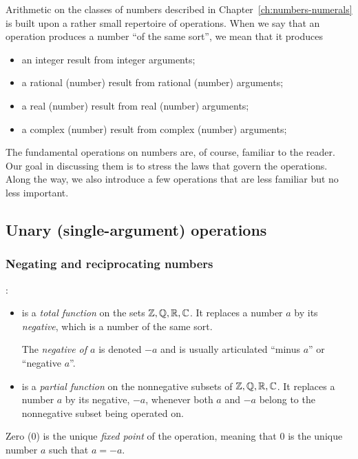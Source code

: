 %
Arithmetic on the classes of numbers described in
Chapter~\ref{ch:numbers-numerals} is built upon a rather small
repertoire of operations.  When we say that an operation produces a
number ``of the same sort'', we mean that it produces
\begin{itemize}
\item
an integer result from integer arguments;
\item
a rational (number) result from rational (number) arguments;
\item
a real (number) result from real (number) arguments;
\item
a complex (number) result from complex (number) arguments;
\end{itemize}
The fundamental operations on numbers are, of course, familiar to the
reader.  Our goal in discussing them is to stress the laws that govern
the operations.  Along the way, we also introduce a few operations
that are less familiar but no less important.

\subsection{Unary (single-argument) operations}
\label{sec:unary-ops}


\subsubsection{Negating and reciprocating numbers}

:
\begin{itemize}
\item
is a {\em total function} on the sets $\mathbb{Z}, \mathbb{Q}, \mathbb{R}, \mathbb{C}$.  It replaces
a number $a$ by its {\em negative},
which is a number of the same sort.

The {\it negative of $a$} is denoted $-a$ and is usually articulated
``minus $a$'' or ``negative $a$''.
\item
is a {\em partial function} on the nonnegative subsets
of $\mathbb{Z}, \mathbb{Q}, \mathbb{R}, \mathbb{C}$.  It replaces a number $a$ by its negative, $-a$,
whenever both $a$ and $-a$ belong to the nonnegative subset being
operated on.
\end{itemize}
Zero ($0$) is the unique {\it fixed point} of the operation,
meaning that $0$ is the unique number $a$ such that $a = -a$.

